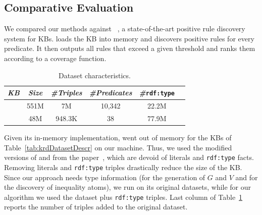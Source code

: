 \subsection{Comparative Evaluation} \label{sec:krd_comparative}
\vspace{-0.5ex}
We compared our methods against \amie~\cite{galarraga2015fast}, a state-of-the-art positive rule discovery system for KBs.
%
\amie loads the KB into memory and discovers positive rules for every predicate. %
It then outputs all rules that exceed a given threshold and ranks them according to a coverage function.

\begin{table}[t]
	\centering
	\caption{\amie Dataset characteristics.}
			\vspace{-2ex}
	\label{tab:AmieDatasetDescr}
	\begin{small}
		\begin{tabular}{|c|c|c|c|c|c|}
			\hline
			\hline
			{\it KB}&{\it Size}&{\it  \#Triples}&{\it \#Predicates}&{\it \#}\texttt{rdf:type}\tabularnewline
			\hline
			\dbpedia & 551M & 7M & 10,342 & 22.2M \tabularnewline
			\yago 2 & 48M & 948.3K & 38 & 77.9M  \tabularnewline
			\hline
		\end{tabular}
	\end{small}
\end{table}

Given its in-memory implementation, \amie went out of memory for the KBs of Table~\ref{tab:krdDatasetDescr} on our machine. Thus, we used the modified versions of \yago and \dbpedia from the \amie paper~\cite{galarraga2015fast}, which are devoid of literals and \texttt{rdf:type} facts.
%
Removing literals and \texttt{rdf:type} triples drastically reduce the size of the KB. Since our approach needs type information (for the generation of $G$ and $V$ and for the discovery of inequality atoms), we run \amie on its original datasets, while for our algorithm we used the \amie dataset plus \texttt{rdf:type} triples. Last column of Table~\ref{tab:AmieDatasetDescr} reports the number of triples added to the original \amie dataset.

